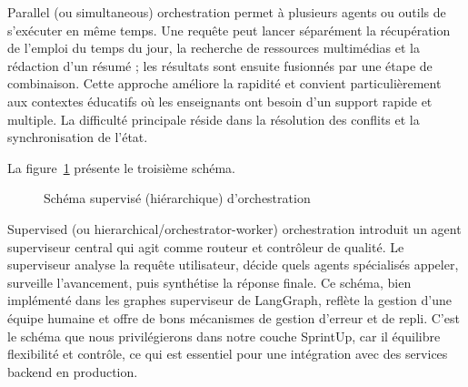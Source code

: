 Parallel (ou simultaneous) orchestration permet à plusieurs agents ou outils de
s'exécuter en même temps. Une requête peut lancer séparément la récupération de
l'emploi du temps du jour, la recherche de ressources multimédias et la rédaction
d'un résumé ; les résultats sont ensuite fusionnés par une étape de combinaison.
Cette approche améliore la rapidité et convient particulièrement aux contextes
éducatifs où les enseignants ont besoin d'un support rapide et multiple. La difficulté
principale réside dans la résolution des conflits et la synchronisation de l'état.

La figure~\ref{fig:supervised} présente le troisième schéma.

\begin{figure}[H]
\centering
{}
\caption{Schéma supervisé (hiérarchique) d'orchestration}
\label{fig:supervised}
\end{figure}

Supervised (ou hierarchical/orchestrator-worker) orchestration introduit un agent
superviseur central qui agit comme routeur et contrôleur de qualité. Le superviseur
analyse la requête utilisateur, décide quels agents spécialisés appeler, surveille
l'avancement, puis synthétise la réponse finale. Ce schéma, bien implémenté dans les
graphes superviseur de LangGraph, reflète la gestion d'une équipe humaine et offre
de bons mécanismes de gestion d'erreur et de repli. C'est le schéma que nous
privilégierons dans notre couche SprintUp, car il équilibre flexibilité et contrôle,
ce qui est essentiel pour une intégration avec des services backend en production.

